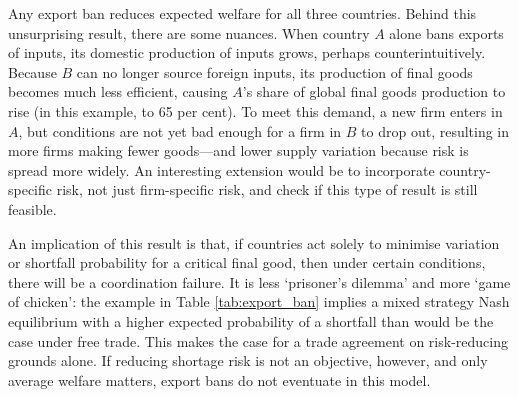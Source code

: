 \documentclass{article}
\begin{document}
Any export ban reduces expected welfare for all three countries. Behind this unsurprising result, there are some nuances. When country $A$ alone bans exports of inputs, its domestic production of inputs grows, perhaps counterintuitively. Because $B$ can no longer source foreign inputs, its production of final goods becomes much less efficient, causing $A$'s share of global final goods production to rise (in this example, to 65 per cent). To meet this demand, a new firm enters in $A$, but conditions are not yet bad enough for a firm in $B$ to drop out, resulting in more firms making fewer goods---and lower supply variation because risk is spread more widely. An interesting extension would be to incorporate country-specific risk, not just firm-specific risk, and check if this type of result is still feasible.

An implication of this result is that, if countries act solely to minimise variation or shortfall probability for a critical final good, then under certain conditions, there will be a coordination failure. It is less `prisoner's dilemma' and more `game of chicken': the example in Table \ref{tab:export_ban} implies a mixed strategy Nash equilibrium with a higher expected probability of a shortfall than would be the case under free trade. This makes the case for a trade agreement on risk-reducing grounds alone. If reducing shortage risk is not an objective, however, and only average welfare matters, export bans do not eventuate in this model.
\end{document}
